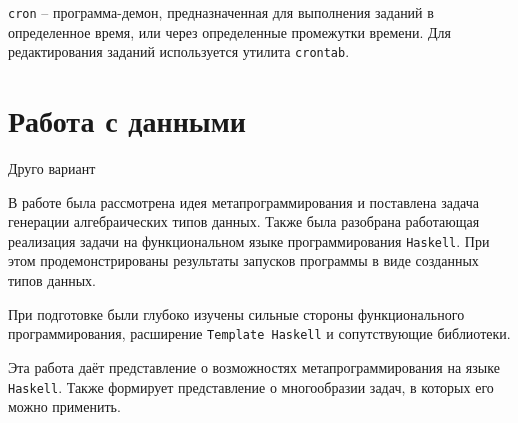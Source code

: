 \lstinline{cron} – программа-демон, предназначенная для выполнения заданий в определенное время, или через определенные промежутки времени. Для редактирования заданий используется утилита \lstinline{crontab}.

\section{Работа с данными}

Друго вариант 

\Conc

В работе была рассмотрена идея метапрограммирования и поставлена задача генерации алгебраических типов данных. Также была разобрана работающая реализация задачи на функциональном языке программирования \lstinline{Haskell}. При этом продемонстрированы результаты запусков программы в виде созданных типов данных.

При подготовке были глубоко изучены сильные стороны функционального программирования, расширение \lstinline{Template Haskell} и сопутствующие библиотеки.

Эта работа даёт представление о возможностях метапрограммирования на языке \lstinline{Haskell}. Также формирует представление о многообразии задач, в которых его можно применить.	

\printbibliography[%
    heading=bibintoc%
]


